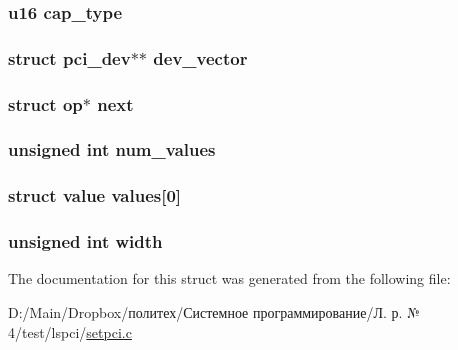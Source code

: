 \subsubsection[{\texorpdfstring{cap\+\_\+type}{cap_type}}]{\setlength{\rightskip}{0pt plus 5cm}u16 cap\+\_\+type}\hypertarget{structop_a15f058d6a6b4f135b5b7e56c07aea31f}{}\label{structop_a15f058d6a6b4f135b5b7e56c07aea31f}
\subsubsection[{\texorpdfstring{dev\+\_\+vector}{dev_vector}}]{\setlength{\rightskip}{0pt plus 5cm}struct pci\+\_\+dev$\ast$$\ast$ dev\+\_\+vector}\hypertarget{structop_abece9153f1b9b01d3eb0c6e613a8a1b0}{}\label{structop_abece9153f1b9b01d3eb0c6e613a8a1b0}
\subsubsection[{\texorpdfstring{next}{next}}]{\setlength{\rightskip}{0pt plus 5cm}struct {\bf op}$\ast$ next}\hypertarget{structop_ab93123386f3ebc4e849a494eeee12f91}{}\label{structop_ab93123386f3ebc4e849a494eeee12f91}
\subsubsection[{\texorpdfstring{num\+\_\+values}{num_values}}]{\setlength{\rightskip}{0pt plus 5cm}unsigned int num\+\_\+values}\hypertarget{structop_ab3c94e60c5982daa125da36e6e3a502c}{}\label{structop_ab3c94e60c5982daa125da36e6e3a502c}
\subsubsection[{\texorpdfstring{values}{values}}]{\setlength{\rightskip}{0pt plus 5cm}struct {\bf value} values\mbox{[}0\mbox{]}}\hypertarget{structop_a146633fb49f86d9bfb291becdea849a4}{}\label{structop_a146633fb49f86d9bfb291becdea849a4}
\subsubsection[{\texorpdfstring{width}{width}}]{\setlength{\rightskip}{0pt plus 5cm}unsigned int width}\hypertarget{structop_aca34d28e3d8bcbcadb8edb4e3af24f8c}{}\label{structop_aca34d28e3d8bcbcadb8edb4e3af24f8c}


The documentation for this struct was generated from the following file\+:\begin{DoxyCompactItemize}
\item 
D\+:/\+Main/\+Dropbox/политех/Системное программирование/Л. р. № 4/test/lspci/\hyperlink{setpci_8c}{setpci.\+c}\end{DoxyCompactItemize}
